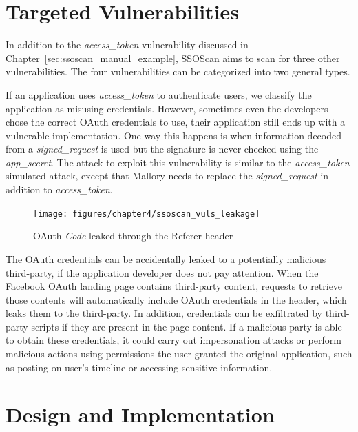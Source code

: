\section{Targeted Vulnerabilities}
\label{sec:ssoscan_vuls}

In addition to the \emph{access\_token} vulnerability discussed in Chapter~\ref{sec:ssoscan_manual_example}, SSOScan aims to scan for three other vulnerabilities.  The four vulnerabilities can be categorized into two general types.

  If an application uses \emph{access\_token} to authenticate users, we classify the application as misusing credentials.  However, sometimes even the developers chose the correct OAuth credentials to use, their application still ends up with a vulnerable implementation.  One way this happens is when information decoded from a \emph{signed\_request} is used but the signature is never checked using the \emph{app\_secret}.  The attack to exploit this vulnerability is similar to the \emph{access\_token} simulated attack, except that Mallory needs to replace the \emph{signed\_request} in addition to \emph{access\_token}.

\begin{figure}[hbt]
\centering
\texttt{[image: figures/chapter4/ssoscan\_vuls\_leakage]}
\caption{OAuth \emph{Code} leaked through the Referer header}
\label{fig:ssoscan_vuls_leakage}
\end{figure}

  The OAuth credentials can be accidentally leaked to a potentially malicious third-party, if the application developer does not pay attention.  When the Facebook OAuth landing page contains third-party content, requests to retrieve those contents will automatically include OAuth credentials in the  header, which leaks them to the third-party.  In addition, credentials can be exfiltrated by third-party scripts if they are present in the page content.  If a malicious party is able to obtain these credentials, it could carry out impersonation attacks or perform malicious actions using permissions the user granted the original application, such as posting on user's timeline or accessing sensitive information.

\section{Design and Implementation}
\label{sec:ssoscan_design}

